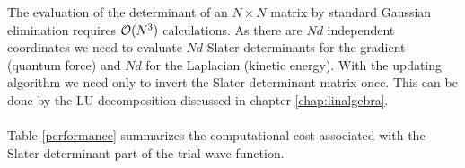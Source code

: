 The evaluation of the determinant of an $N \times N$ matrix by standard Gaussian elimination requires ${\cal O}(N^3)$
calculations. As there are $Nd$ independent coordinates we need to evaluate $Nd$ Slater determinants for the gradient (quantum force) and $Nd$ for the Laplacian (kinetic energy). With the updating algorithm we need only to invert the Slater determinant matrix once. This can be done by the LU decomposition discussed in chapter \ref{chap:linalgebra}.\\
\\
\noindent
Table \ref{performance} summarizes the computational cost associated with the Slater determinant part of the trial wave function.

